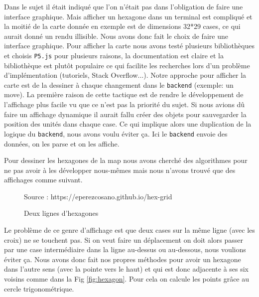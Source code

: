 Dans le sujet il était indiqué que l'on n'était pas dans l'obligation de faire une interface graphique. Mais afficher un hexagone dans un terminal est compliqué et la moitié de la carte donnée en exemple est de dimensions 32*29 cases, ce qui aurait donné un rendu illisible. Nous avons donc fait le choix de faire une interface graphique. Pour afficher la carte nous avons testé plusieurs bibliothèques et choisis \lstinline{P5.js} pour plusieurs raisons, la documentation est claire et la bibliothèque est plutôt populaire ce qui facilite les recherches lors d'un problème d'implémentation (tutoriels, Stack Overflow...).
Notre approche pour afficher la carte est de la dessiner à chaque changement dans le \lstinline{backend} (exemple: un move). La première raison de cette tactique est de rendre le développement de l'affichage plus facile vu que ce n'est pas la priorité du sujet. Si nous avions dû faire un affichage dynamique il aurait fallu créer des objets pour sauvegarder la position des unités dans chaque case. Ce qui implique alors une duplication de la logique du \lstinline{backend}, nous avons voulu éviter ça. Ici le \lstinline{backend} envoie des données, on les parse et on les affiche.

Pour dessiner les hexagones de la map nous avons cherché des algorithmes pour ne pas avoir à les développer nous-mêmes mais nous n'avons trouvé que des affichages comme suivant.

\begin{figure}[H]
    \centering
    \def\stackalignment{r}
    {\scriptsize%
        Source : https://eperezcosano.github.io/hex-grid}
    \caption{Deux lignes d'hexagones}
    \label{fig:hexmap_exemple}
\end{figure}

Le problème de ce genre d'affichage est que deux cases sur la même ligne (avec les croix) ne se touchent pas. Si on veut faire un déplacement on doit alors passer par une case intermédiaire dans la ligne au-dessus ou au-dessous, nous voulions éviter ça. Nous avons donc fait nos propres méthodes pour avoir un hexagone dans l'autre sens (avec la pointe vers le haut) et qui est donc adjacente à ses six voisins comme dans la Fig \ref{fig:hexagon}. Pour cela on calcule les points grâce au cercle trigonométrique.



